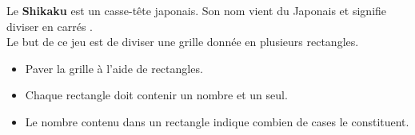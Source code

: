 \begin{enigme}[Shikaku]
    \begin{changemargin}{-10mm}{-10mm}
        Le {\bf Shikaku} est un casse-tête japonais. Son nom vient du Japonais et signifie \og diviser en carrés \fg. \\
        Le but de ce jeu est de diviser une grille donnée en plusieurs rectangles. \medskip
        
        \begin{itemize}
            \item Paver la grille à l'aide de rectangles.
            \item Chaque rectangle doit contenir un nombre et un seul.
            \item Le nombre contenu dans un rectangle indique combien de cases le constituent. \medskip
        \end{itemize}
    

\end{changemargin}
\end{enigme}
